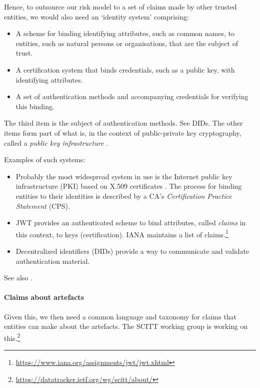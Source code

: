 Hence, to outsource our risk model to a set of claims made by other trusted entities, we would also need an `identity system' comprising:
\begin{itemize}
  \item A scheme for binding identifying attributes, such as common names, to entities, such as natural persons or organisations, that are the subject of trust.
  \item A certification system that binds credentials, such as a public key, with identifying attributes.
  \item A set of authentication methods and accompanying credentials for verifying this binding. 
\end{itemize}
The third item is the subject of authentication methods. See DIDs.
%
The other items form part of what is, in the context of public-private key cryptography, called a \emph{public key infrastructure} \cite{rfc5280}.

Examples of such systems:
\begin{itemize}
  \item
    Probably the most widespread system in use is the Internet public key infrastructure (PKI) based on X.509 certificates \cite{rfc5280}.
    The process for binding entities to their identities is described by a CA's \emph{Certification Practice Statement} (CPS).
  \item 
    JWT \cite{rfc7519} provides an authenticated scheme to bind attributes, called \emph{claims} in this context, to keys (certification). IANA maintains a list of claims.\footnote{\url{https://www.iana.org/assignments/jwt/jwt.xhtml}}
  \item
    Decentralized identifiers (DIDs) provide a way to communicate and validate authentication material.
\end{itemize}
See also \cite{gerck1997overview}.

\paragraph{Claims about artefacts} Given this, we then need a common language and taxonomy for claims that entities can make about the artefacts.
%
The SCITT working group is working on this.\footnote{\url{https://datatracker.ietf.org/wg/scitt/about/}}

